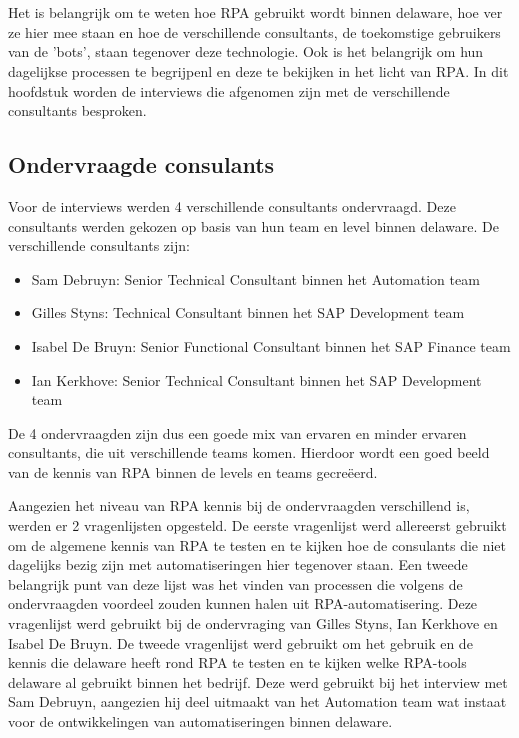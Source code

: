 \chapter{}%
\label{ch:interviews}

Het is belangrijk om te weten hoe RPA gebruikt wordt binnen delaware, hoe ver ze hier mee staan en hoe de verschillende consultants, de toekomstige gebruikers van de 'bots', staan tegenover deze technologie. Ook is het belangrijk om hun dagelijkse processen te begrijpenl en deze te bekijken in het licht van RPA. In dit hoofdstuk worden de interviews die afgenomen zijn met de verschillende consultants besproken.

\section{Ondervraagde consulants}
\label{sec:ondervraagde-consulants}

Voor de interviews werden 4 verschillende consultants ondervraagd. Deze consultants werden gekozen op basis van hun team en level binnen delaware. De verschillende consultants zijn:

\begin{itemize}
    \item Sam Debruyn: Senior Technical Consultant binnen het Automation team
    \item Gilles Styns: Technical Consultant binnen het SAP Development team
    \item Isabel De Bruyn: Senior Functional Consultant binnen het SAP Finance team
    \item Ian Kerkhove: Senior Technical Consultant binnen het SAP Development team
\end{itemize}

De 4 ondervraagden zijn dus een goede mix van ervaren en minder ervaren consultants, die uit verschillende teams komen. Hierdoor wordt een goed beeld van de kennis van RPA binnen de levels en teams gecreëerd.

Aangezien het niveau van RPA kennis bij de ondervraagden verschillend is, werden er 2 vragenlijsten opgesteld. De eerste vragenlijst werd allereerst gebruikt om de algemene kennis van RPA te testen en te kijken hoe de consulants die niet dagelijks bezig zijn met automatiseringen hier tegenover staan. Een tweede belangrijk punt van deze lijst was het vinden van processen die volgens de ondervraagden voordeel zouden kunnen halen uit RPA-automatisering. Deze vragenlijst werd gebruikt bij de ondervraging van Gilles Styns, Ian Kerkhove en Isabel De Bruyn.
De tweede vragenlijst werd gebruikt om het gebruik en de kennis die delaware heeft rond RPA te testen en te kijken welke RPA-tools delaware al gebruikt binnen het bedrijf. Deze werd gebruikt bij het interview met Sam Debruyn, aangezien hij deel uitmaakt van het Automation team wat instaat voor de ontwikkelingen van automatiseringen binnen delaware.

